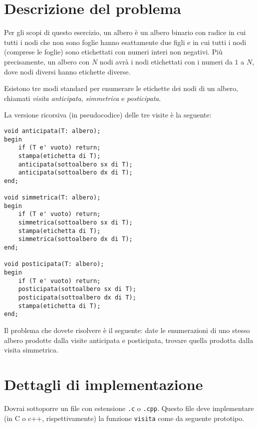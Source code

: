 \documentclass[a4paper,11pt]{article}
\newcommand{\gara}{OII 2003}
\newcommand{\nome}{Alberi}
\newcommand{\nomebreve}{alberi}
\begin{document}
\noindent{\Large \gara}
\vspace{0.5cm}

\noindent{\Huge \textbf \nome~(\texttt{\nomebreve})}

\section*{Descrizione del problema}

Per gli scopi di questo esercizio, un albero è un albero binario con radice in cui tutti i nodi che non sono foglie hanno esattamente due figli e in cui tutti i nodi (comprese le foglie) sono etichettati con numeri interi non negativi.
Più precisamente, un albero con $N$ nodi avr\`a i nodi etichettati con i numeri da $1$ a $N$, dove nodi diversi hanno etichette diverse.

Esistono tre modi standard per enumerare le etichette dei nodi di un albero, chiamati \emph{visita anticipata}, \emph{simmetrica} e \emph{posticipata}.

La versione ricorsiva (in pseudocodice) delle tre visite è la seguente:

\begin{verbatim}
void anticipata(T: albero);
begin
    if (T e' vuoto) return;
    stampa(etichetta di T);
    anticipata(sottoalbero sx di T);
    anticipata(sottoalbero dx di T);
end;

void simmetrica(T: albero);
begin
    if (T e' vuoto) return;
    simmetrica(sottoalbero sx di T);
    stampa(etichetta di T);
    simmetrica(sottoalbero dx di T);
end;

void posticipata(T: albero);
begin
    if (T e' vuoto) return;
    posticipata(sottoalbero sx di T);
    posticipata(sottoalbero dx di T);
    stampa(etichetta di T);
end;
\end{verbatim}


Il problema che dovete risolvere è il seguente:
date le enumerazioni di uno stesso albero prodotte dalla visite anticipata e posticipata, trovare quella prodotta dalla visita simmetrica.


\section*{Dettagli di implementazione}
Dovrai sottoporre un file con estensione \texttt{.c} o
\texttt{.cpp}.
Questo file deve implementare (in C o c++, rispettivamente)
la funzione \texttt{visita} come da seguente prototipo.
\end{document}
